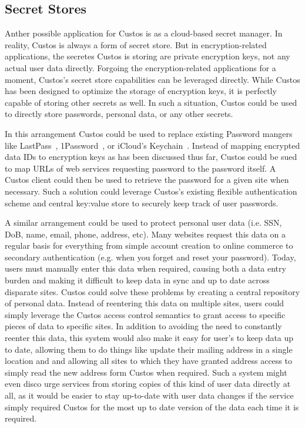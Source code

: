 \subsection{Secret Stores}

Anther possible application for Custos is as a cloud-based secret
manager. In reality, Custos is always a form of secret store. But in
encryption-related applications, the secretes Custos is storing are
private encryption keys, not any actual user data directly. Forgoing
the encryption-related applications for a moment, Custos's secret store
capabilities can be leveraged directly. While Custos has been designed
to optimize the storage of encryption keys, it is perfectly capable of
storing other secrets as well. In such a situation, Custos could be
used to directly store passwords, personal data, or any other secrets.

In this arrangement Custos could be used to replace existing Password
mangers like LastPass~\cite{lastpass}, 1Password~\cite{onepassword}, or
iCloud's Keychain~\cite{icloud}. Instead of mapping encrypted data IDs
to encryption keys as has been discussed thus far, Custos could be
sued to map URLs of web services requesting password to the password
itself. A Custos client could then be used to retrieve the password
for a given site when necessary. Such a solution could leverage
Custos's existing flexible authentication scheme and central key:value
store to securely keep track of user passwords.

A similar arrangement could be used to protect personal user data
(i.e. SSN, DoB, name, email, phone, address, etc). Many websites
request this data on a regular basis for everything from simple
account creation to online commerce to secondary authentication
(e.g. when you forget and reset your password). Today, users must
manually enter this data when required, causing both a data entry
burden and making it difficult to keep data in sync and up to date
across disparate sites. Custos could solve these problems by creating
a central repository of personal data. Instead of reentering this data
on multiple sites, users could simply leverage the Custos access
control semantics to grant access to specific pieces of data to
specific sites. In addition to avoiding the need to constantly reenter
this data, this system would also make it easy for user's to keep data
up to date, allowing them to do things like update their mailing
address in a single location and and allowing all sites to which they
have granted address access to simply read the new address form Custos
when required. Such a system might even disco urge services from
storing copies of this kind of user data directly at all, as it would
be easier to stay up-to-date with user data changes if the service
simply required Custos for the most up to date version of the data
each time it is required.

